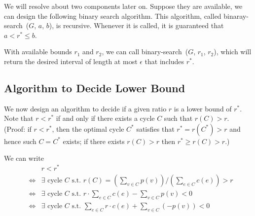We will resolve about two components later on. Suppose they are available, we can design the following binary
search algorithm. This algorithm, called binaray-search~($G$, $a$, $b$), is recursive.
Whenever it is called, it is guaranteed that $a < r^* \le b$.

\begin{minipage}{0.8\textwidth}
	\xxx
	\aab {if $b - a \le \epsilon$: report interval $(a,b]$ and exit;}\xxx
	\xxx
	\xxx
	\xxx
	\xxx
	\xxx
\end{minipage}

With available bounds $r_1$ and $r_2$, we can call binary-search~($G$, $r_1$, $r_2$), which will return
the desired interval of length at most $\epsilon$ that includes $r^*$.


\subsection*{Algorithm to Decide Lower Bound}

We now design an algorithm to decide if a given ratio $r$ is a lower bound of $r^*$.
Note that $r < r^*$ if and only if there exists a cycle $C$ such that $r(C) > r$.
(Proof: if $r < r^*$, then the optimal cycle $C^*$ satisfies that $r^* = r(C^*) > r$ and hence such $C = C^*$ exists;
if there exists $r(C) > r$ then $r^* \ge r(C) > r$.)

We can write
\begin{eqnarray*}
& & r < r^* \\
& \Longleftrightarrow & \exists \textrm{ cycle } C \textrm{ s.t.\ } \textstyle r(C) = (\sum_{v\in C} p(v)) / (\sum_{e\in C} c(e)) > r \\
& \Longleftrightarrow & \exists \textrm{ cycle } C \textrm{ s.t.\ } \textstyle r\cdot \sum_{e\in C} c(e) - \sum_{v\in C} p(v) < 0\\
& \Longleftrightarrow & \exists \textrm{ cycle } C \textrm{ s.t.\ } \textstyle \sum_{e\in C} r\cdot c(e) + \sum_{v\in C} (-p(v)) < 0
\end{eqnarray*}

